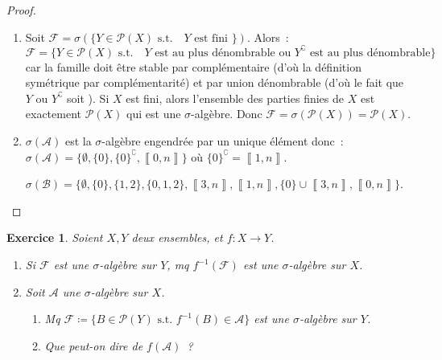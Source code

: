 \documentclass{article}
\newtheorem{ex}{Exercice}[section]
\theoremstyle{definition}
\newcommand{\st}{\text{ s.t. }}
\newcommand{\C}{\complement}
\newcommand{\intint}[2]{\left\llbracket#1, #2\right\rrbracket}
\begin{document}
\begin{proof}~
\begin{enumerate}
	\item Soit $\mathcal F = \sigma(\{Y \in \mathcal P(X) \st \text{ $Y$ est fini }\})$. Alors~:
	\[\mathcal F = \{Y \in \mathcal P(X) \st \text{ $Y$ est au plus dénombrable ou $Y^\C$ est au plus dénombrable}\}\]
	car la famille doit être stable par complémentaire (d'où la définition symétrique par complémentarité) et par union dénombrable (d'où le fait
	que $Y$ ou $Y^\C$ soit ). Si $X$ est fini, alors l'ensemble des parties finies de $X$ est exactement $\mathcal P(X)$
	qui est une $\sigma$-algèbre. Donc $\mathcal F = \sigma(\mathcal P(X)) = \mathcal P(X)$.
	\item $\sigma(\mathcal A)$ est la $\sigma$-algèbre engendrée par un unique élément donc~: $\sigma(\mathcal A) = \{\emptyset, \{0\}, \{0\}^\C, \intint 0n\}$
	où $\{0\}^\C = \intint 1n$.

	$\sigma(\mathcal B) = \{\emptyset, \{0\}, \{1, 2\}, \{0, 1, 2\}, \intint 3n, \intint 1n, \{0\} \cup \intint 3n, \intint 0n\}$.
\end{enumerate}
\end{proof}

\begin{ex} Soient $X, Y$ deux ensembles, et $f : X \to Y$.
\begin{enumerate}
	\item Si $\mathcal F$ est une $\sigma$-algèbre sur $Y$, mq $f^{-1}(\mathcal F)$ est une $\sigma$-algèbre sur $X$.
	\item Soit $\mathcal A$ une $\sigma$-algèbre sur $X$.
	\begin{enumerate}
		\item Mq $\mathcal F \coloneqq \{B \in \mathcal P(Y) \st f^{-1}(B) \in \mathcal A\}$ est une $\sigma$-algèbre sur $Y$.
		\item Que peut-on dire de $f(\mathcal A)$~?
	\end{enumerate}
\end{enumerate}
\end{ex}
\end{document}
